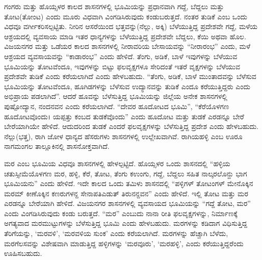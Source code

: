 ಗಂಗರು ಮತ್ತು ಹೊಯ್ಸಳರ ಕಾಲದ ಶಾಸನಗಳಲ್ಲಿ ಭೂಮಿಯನ್ನು ಪ್ರಧಾನವಾಗಿ ಗದ್ದೆ, ಬೆದ್ದಲು ಮತ್ತು ತೋಟ(ತೋಂಟ) ಎಂದು ಮೂರು ವಿಧವಾಗಿ ವಿಂಗಡಿಸಿರುವುದು ಕಂಡುಬರುತ್ತದೆ. ನಂತರ ತುಡಿಕೆ ಎಂಬ ಒಂದು ವಿಧವೂ ವರ್ಗೀಕರಿಸಲ್ಪಟ್ಟಿತು. ನೀರಿನ ಆಸರೆಯಿಂದ ಭತ್ತವನ್ನು(ನೆಲ್ಲು, ಅಕ್ಕಿ) ಬೆಳೆಯುತ್ತಿದ್ದ ಪ್ರದೇಶವೇ ಗದ್ದೆ, ಮಳೆಯ ಆಶ್ರಯದಲ್ಲಿ ವ್ಯವಸಾಯ ಮಾಡಿ ಇತರ ಧಾನ್ಯಗಳನ್ನು ಬೆಳೆಯುತ್ತಿದ್ದ ಪ್ರದೇಶವೇ ಬೆದ್ದಲು, ಕೆಯಿ ಅಥವಾ ಹೊಲ. ವಿಜಯನಗರ ಮತ್ತು ಒಡೆಯರ ಕಾಲದ ಶಾಸನಗಳಲ್ಲಿ ನೀರಾವರಿಯ ಬೇಸಾಯವನ್ನು “ನೀರಾರಂಭ” ಎಂದು, ಮಳೆ ಆಶ್ರಯದ ವ್ಯವಸಾಯವನ್ನು “ಕಾಡಾರಂಭ” ಎಂದು ಹೇಳಿದೆ. ತೆಂಗು, ಅಡಿಕೆ, ಬಾಳೆ ಇವುಗಳನ್ನು ಬೆಳೆಯುವ ಭೂಮಿಯನ್ನು ತೋಟವೆಂದೂ, ಇವುಗಳನ್ನು ಬಿಟ್ಟು ಫಲವೃಕ್ಷಗಳೂ ಸೇರಿದಂತೆ ಇತರೆ ವೃಕ್ಷಗಳನ್ನು ಬೆಳೆಯುವ ಪ್ರದೇಶವೇ ತುಡಿಕೆ ಎಂದು ಕರೆಯಲಾಗಿದೆ ಎಂದು ಹೇಳಬಹುದು. “ತೆಂಗು, ಅಡಿಕೆ, ಬಾಳೆ ಮುಂತಾದವನ್ನು ಬೆಳೆಸುವ ಭೂಮಿಯನ್ನು ತೋಟವೆಂದೂ, ಹೂಗಿಡಗಳನ್ನು ಬೆಳೆಸುವ ಉದ್ಯಾನವನ್ನು ತುಡಿಕೆ ಎಂದೂ ಕರೆಯುತ್ತಿದ್ದರು ಎಂದು ಅಭಿಪ್ರಾಯ ಪಡಲಾಗಿದೆ”. ಆದರೆ ಹೂವನ್ನು ಬೆಳೆಸುತ್ತಿದ್ದ ಭೂಮಿಯನ್ನು ಜಿಲ್ಲೆಯ ಅನೇಕ ಶಾಸನಗಳಲ್ಲಿ ಪುಷ್ಪೋದ್ಯಾನ, ನಂದನವನ ಎಂದು ಕರೆಯಲಾಗಿದೆ. “ದೇವರ ಹೂದೋಟದ ಭೂಮಿ”, “ಕೆರೆಯೊಳಗಣ ಹೂದೋಟವೊಂದು। ಯಪ್ಪತ್ತು ಕಂಬದ ತುಡಕೆವೊಂದು” ಎಂದು ಹೂದೋಟ ಮತ್ತು ತುಡಕೆ ಎರಡನ್ನೂ ಬೇರೆ ಬೇರೆಯಾಗಿಯೇ ಹೇಳಿದೆ. ಆದುದರಿಂದ ತುಡಕೆ ಎಂದರೆ ಫಲವೃಕ್ಷಗಳನ್ನು ಬೆಳೆಸುತ್ತಿದ್ದ ಪ್ರದೇಶ ಎಂದು ಹೇಳಬಹುದು. ನೆಲ್ಲು(ಭತ್ತ), ರಾಗಿ ಜೋಳ ಧಾನ್ಯದ ಹೆಸರುಗಳು ಶಾಸನಗಳಲ್ಲಿ ಉಲ್ಲೇಖವಾಗಿವೆ. ರಾಗಿಯಹಳ್ಳಿ ಎಂಬ ಊರೂ ನಾಗಮಂಗಲ ತಾಲ್ಲೂಕಿನಲ್ಲಿ ಶಾಸನೋಕ್ತವಾಗಿದೆ.

ಮರ ಎಂಬ ಭೂಮಿಯ ವಿಧವೂ ಶಾಸನಗಳಲ್ಲಿ ಹೇಳಲ್ಪಟ್ಟಿದೆ. ಹೊಯ್ಸಳರ ಒಂದು ಶಾಸನದಲ್ಲಿ “ಹಳ್ಳಿಯ ಚತುಸ್ಸೀಮೆಯೊಳಗಣ ಮರ, ಹಳ್ಳಿ, ಕೆರೆ, ತೋಟ, ತೆಂಗು ಕಉಂಗು, ಗದ್ದೆ, ಬೆದ್ದಲು ಸಹಿತ ನಾಲ್ಕರಲೊನ್ದು ಭಾಗ ಭೂಮಿಯನು” ಎಂದು ಹೇಳಿದೆ. ಇದೇ ಕಾಲದ ಒಂದು ತಮಿಳು ಶಾಸನದಲ್ಲಿ “ಪಳ್ಳಿಗಳ್​ ತೋಟಂಗಳ್​ ಮೇನೊಕ್ಕಿನ ಮರಮ್ ಕೀಣೊಕ್ಕಿನ ಕಣರುಗಳನ್ದ ಸೇನಾಪತಿಎಡುತ್​ ತಿರುನನ್ದವನ” ಎಂದು ಹೇಳಿದೆ. ಇಲ್ಲಿ ತೋಟ ಮತ್ತು ಮರ ಎರಡನ್ನೂ ಬೇರೆಯಾಗಿ ಹೇಳಿದೆ. ವಿಜಯನಗರ ಶಾಸನಗಳಲ್ಲಿ ವ್ಯವಸಾಯದ ಭೂಮಿಯನ್ನು “ಗದ್ದೆ ತೋಟ, ಮರ” ಎಂದು ವಿಂಗಡಿಸಿರುವುದು ಕಂಡು ಬರುತ್ತದೆ. “ಮರ” ಎಂಬುದು ನಾನಾ ರೀತಿ ಫಲವೃಕ್ಷಗಳನ್ನು, ನಿರ್ಮಾಣಕ್ಕೆ ಅಗತ್ಯವಾದ ಮರಮುಟ್ಟುಗಳನ್ನು ಬೆಳೆಸುತ್ತಿದ್ದ ಭೂಮಿ ಎಂದು ಹೇಳಬಹುದು. ಮರಗಳನ್ನು ಕಡಿದಾಗ ವಿಧಿಸುತ್ತಿದ್ದ ತೆರಿಗೆಯನ್ನು, ‘ಮರವಳಿ’, ‘ಮರವಳಿಯ ಸುಂಕ’ ಎಂದು ಕರೆಯಲಾಗಿದೆ. ಮರಗಳನ್ನು ಹೆಚ್ಚಾಗಿ ಬೆಳೆದು, ಮರಗೆಲಸವನ್ನು ವಿಶೇಷವಾಗಿ ಮಾಡುತ್ತಿದ್ದ ಹಳ್ಳಿಗಳನ್ನು ‘ಮರವೂರು’, ‘ಮರಹಳ್ಳಿ’, ಎಂದು ಕರೆಯುತ್ತಿದ್ದರೆಂದು ಊಹಿಸಬಹುದು.

